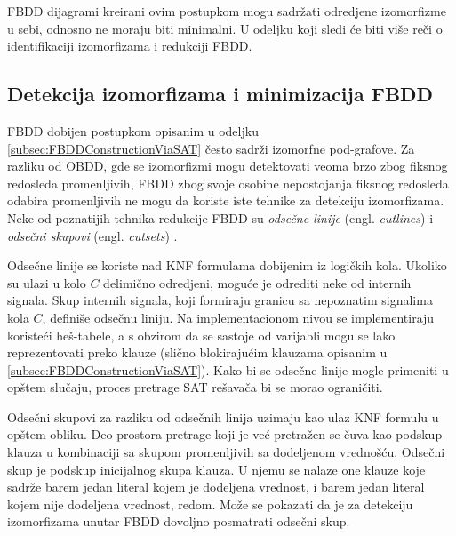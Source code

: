 FBDD dijagrami kreirani ovim postupkom mogu sadr\v{z}ati odredjene izomorfizme u sebi, odnosno ne moraju biti minimalni. U odeljku koji sledi \'c{}e biti vi\v{s}e re\v{c}i o identifikaciji izomorfizama i redukciji FBDD.


\subsection{Detekcija izomorfizama i minimizacija FBDD}
\label{subsec:FBDDMinimization}

FBDD dobijen postupkom opisanim u odeljku \ref{subsec:FBDDConstructionViaSAT} \v{c}esto sadr\v{z}i izomorfne pod-grafove. Za razliku od OBDD, gde se izomorfizmi mogu detektovati veoma brzo zbog fiksnog redosleda promenljivih, FBDD zbog svoje osobine nepostojanja fiksnog redosleda odabira promenljivih ne mogu da koriste iste tehnike za detekciju izomorfizama. Neke od poznatijih tehnika redukcije FBDD su \emph{odse\v{c}ne linije} (engl. \emph{cutlines}) i \emph{odse\v{c}ni skupovi} (engl. \emph{cutsets}) \cite{FBDD}.


Odse\v{c}ne linije se koriste nad KNF formulama dobijenim iz logi\v{c}kih kola. Ukoliko su ulazi u kolo $C$ delimi\v{c}no odredjeni, mogu\'c{}e je odrediti neke od internih signala. Skup internih signala, koji formiraju granicu sa nepoznatim signalima kola $C$, defini\v{s}e odse\v{c}nu liniju. Na implementacionom nivou se implementiraju koriste\'c{}i he\v{s}-tabele, a s obzirom da se sastoje od varijabli mogu se lako reprezentovati preko klauze (sli\v{c}no blokiraju\'c{}im klauzama opisanim u \ref{subsec:FBDDConstructionViaSAT}). Kako bi se odse\v{c}ne linije mogle primeniti u op\v{s}tem slu\v{c}aju, proces pretrage SAT re\v{s}ava\v{c}a bi se morao ograni\v{c}iti.

Odse\v{c}ni skupovi za razliku od odse\v{c}nih linija uzimaju kao ulaz KNF formulu u op\v{s}tem obliku. Deo prostora pretrage koji je ve\'c{} pretra\v{z}en se \v{c}uva kao podskup klauza u kombinaciji sa skupom promenljivih sa dodeljenom vredno\v{s}\'c{}u. Odse\v{c}ni skup je podskup inicijalnog skupa klauza. U njemu se nalaze one klauze koje sadr\v{z}e barem jedan literal kojem je dodeljena vrednost, i barem jedan literal kojem nije dodeljena vrednost, redom. Mo\v{z}e se pokazati da je za detekciju izomorfizama unutar FBDD dovoljno posmatrati odse\v{c}ni skup.
